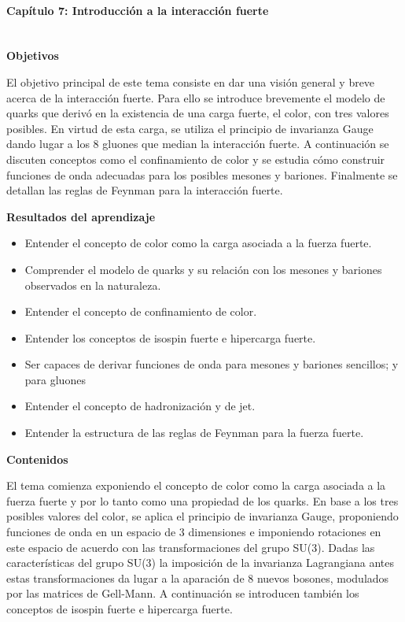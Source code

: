 \paragraph{Capítulo 7: Introducción a la interacción fuerte\\\\}

\textbf{Objetivos}

El objetivo principal de este tema consiste en dar una visión general y breve acerca de la interacción fuerte. Para ello se introduce brevemente el modelo de quarks que derivó en la existencia de una carga fuerte, el color, con tres valores posibles. En virtud de esta carga, se utiliza el principio de invarianza Gauge dando lugar a los 8 gluones que median la interacción fuerte. A continuación se discuten conceptos como el confinamiento de color y se estudia cómo construir funciones de onda adecuadas para los posibles mesones y bariones. Finalmente se detallan las reglas de Feynman para la interacción fuerte. 

\textbf{Resultados del aprendizaje}

\begin{itemize}
    \item Entender el concepto de color como la carga asociada a la fuerza fuerte.
    \item Comprender el modelo de quarks y su relación con los mesones y bariones observados en la naturaleza.
    \item Entender el concepto de confinamiento de color.
    \item Entender los conceptos de isospin fuerte e hipercarga fuerte.
    \item Ser capaces de derivar funciones de onda para mesones y bariones sencillos; y para gluones
    \item Entender el concepto de hadronización y de jet.
    \item Entender la estructura de las reglas de Feynman para la fuerza fuerte.
    
\end{itemize}

\textbf{Contenidos}

El tema comienza exponiendo el concepto de color como la carga asociada a la fuerza fuerte y por lo tanto como una propiedad de los quarks. En base a los tres posibles valores del color, se aplica el principio de invarianza Gauge, proponiendo funciones de onda en un espacio de 3 dimensiones e imponiendo rotaciones en este espacio de acuerdo con las transformaciones del grupo SU(3). Dadas las características del grupo SU(3) la imposición de la invarianza Lagrangiana antes estas transformaciones da lugar a la aparación de 8 nuevos bosones, modulados por las matrices de Gell-Mann. A continuación se introducen también los conceptos de isospin fuerte e hipercarga fuerte.

